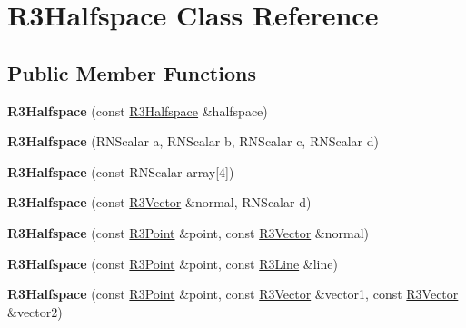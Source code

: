 \hypertarget{class_r3_halfspace}{}\section{R3\+Halfspace Class Reference}
\label{class_r3_halfspace}
\subsection*{Public Member Functions}
\begin{DoxyCompactItemize}
\item 
{\bfseries R3\+Halfspace} (const \hyperlink{class_r3_halfspace}{R3\+Halfspace} \&halfspace)\hypertarget{class_r3_halfspace_a38e51384c461ca6bdc25c0c58ceadbc2}{}\label{class_r3_halfspace_a38e51384c461ca6bdc25c0c58ceadbc2}

\item 
{\bfseries R3\+Halfspace} (R\+N\+Scalar a, R\+N\+Scalar b, R\+N\+Scalar c, R\+N\+Scalar d)\hypertarget{class_r3_halfspace_acf15dc5126ff0a42b9d5676562446287}{}\label{class_r3_halfspace_acf15dc5126ff0a42b9d5676562446287}

\item 
{\bfseries R3\+Halfspace} (const R\+N\+Scalar array\mbox{[}4\mbox{]})\hypertarget{class_r3_halfspace_a2bb92068dec6ce800287476c186160a1}{}\label{class_r3_halfspace_a2bb92068dec6ce800287476c186160a1}

\item 
{\bfseries R3\+Halfspace} (const \hyperlink{class_r3_vector}{R3\+Vector} \&normal, R\+N\+Scalar d)\hypertarget{class_r3_halfspace_aea486a2a582e608917fa70b1d5a14a43}{}\label{class_r3_halfspace_aea486a2a582e608917fa70b1d5a14a43}

\item 
{\bfseries R3\+Halfspace} (const \hyperlink{class_r3_point}{R3\+Point} \&point, const \hyperlink{class_r3_vector}{R3\+Vector} \&normal)\hypertarget{class_r3_halfspace_a3db41965e02c8d9148368bf7c9e894fb}{}\label{class_r3_halfspace_a3db41965e02c8d9148368bf7c9e894fb}

\item 
{\bfseries R3\+Halfspace} (const \hyperlink{class_r3_point}{R3\+Point} \&point, const \hyperlink{class_r3_line}{R3\+Line} \&line)\hypertarget{class_r3_halfspace_ac94c9521ff96ae2a0d51d1a402b3b692}{}\label{class_r3_halfspace_ac94c9521ff96ae2a0d51d1a402b3b692}

\item 
{\bfseries R3\+Halfspace} (const \hyperlink{class_r3_point}{R3\+Point} \&point, const \hyperlink{class_r3_vector}{R3\+Vector} \&vector1, const \hyperlink{class_r3_vector}{R3\+Vector} \&vector2)\hypertarget{class_r3_halfspace_a3c5f21c4062fecef9c18782d0d25ea8b}{}\label{class_r3_halfspace_a3c5f21c4062fecef9c18782d0d25ea8b}


\end{DoxyCompactItemize}

